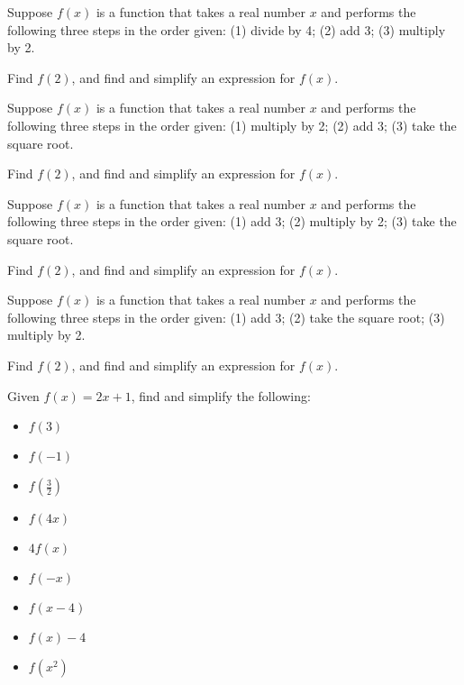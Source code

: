 \documentclass{ximera}
\begin{document}
\begin{problem}
    Suppose $f(x)$ is a function that takes a real number $x$ and performs the following three steps in the order given:   (1) divide by 4; (2) add 3; (3) multiply by 2.

    Find $f(2)$, and find and simplify an expression for $f(x)$.
\end{problem}


\begin{problem}
    Suppose $f(x)$ is a function that takes a real number $x$ and performs the following three steps in the order given:    (1) multiply by 2; (2) add 3; (3) take the square root.

    Find $f(2)$, and find and simplify an expression for $f(x)$.
\end{problem}


\begin{problem}
    Suppose $f(x)$ is a function that takes a real number $x$ and performs the following three steps in the order given:   (1) add 3; (2) multiply by 2; (3) take the square root.

    Find $f(2)$, and find and simplify an expression for $f(x)$.
\end{problem}

\begin{problem}\label{buildfunctionlast}
    Suppose $f(x)$ is a function that takes a real number $x$ and performs the following three steps in the order given:   (1) add 3; (2) take the square root; (3) multiply by 2.

    Find $f(2)$, and find and simplify an expression for $f(x)$.
\end{problem}







\begin{problem}\label{funcnotationbasicfirst} 
Given $f(x) = 2x+1$,
find and simplify the following:

\begin{itemize}
\item $f(3)$
\item $f(-1)$
\item $f\left(\frac{3}{2} \right)$

\item  $f(4x)$
\item $4f(x)$
\item $f(-x)$

\item  $f(x-4)$
\item $f(x) - 4$
\item  $f\left(x^2\right)$
\end{itemize}
\end{problem}  
\end{document}
